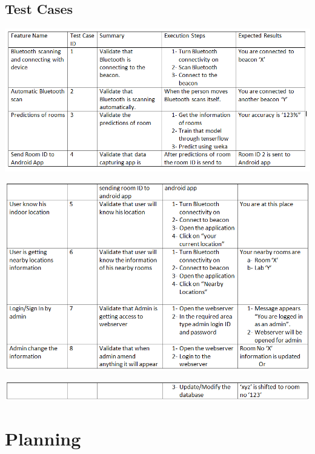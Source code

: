 \documentclass{article}
\begin{document}
\subsection{Test Cases}
\begin{center}
\includegraphics[scale=0.8]{tc1}

\end{center}
\begin{center}
\includegraphics[scale=0.8]{tc2}

\end{center}
\begin{center}
\includegraphics[scale=0.8]{tc3}
\end{center}

\section{Planning}
\end{document}
